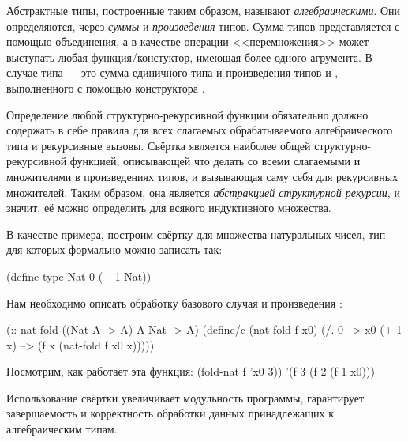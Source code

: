 \noindent
Абстрактные типы, построенные таким образом, называют \emph{алгебраическими}. Они определяются, через \emph{суммы} и \emph{произведения} типов. Сумма типов представляется с помощью объединения, а в качестве операции <<перемножения>> может выступать любая функция\=/констуктор, имеющая более одного агрумента. В случае типа  --- это сумма единичного типа  и произведения типов  и , выполненного с помощью конструктора .

Определение любой структурно-рекурсивной функции обязательно должно содержать в себе правила для всех слагаемых обрабатываемого алгебраического типа и рекурсивные вызовы. Свёртка является наиболее общей структурно-рекурсивной функцией, описывающей что делать со всеми слагаемыми и множителями в произведениях типов, и вызывающая саму себя для рекурсивных множителей.
Таким образом, она является \emph{абстракцией структурной рекурсии}, и значит, её можно определить для всякого индуктивного множества. 

В качестве примера, построим свёртку для множества натуральных чисел, тип для которых формально можно записать так:
\vspace{-\bigskipamount}
\begin{SchemeCode}
(define-type Nat
  0
  (+ 1 Nat))
\end{SchemeCode}

\noindent
Нам необходимо описать обработку базового случая  и произведения :
\begin{Definition}
(:: nat-fold ((Nat A -> A) A Nat -> A)
  (define/c (nat-fold f x0)
    (/. 0 --> x0
        (+ 1 x) --> (f x (nat-fold f x0 x)))))
\end{Definition}
Посмотрим, как работает эта функция:
\REPL
  {(fold-nat f 'x0 3))}
  {'(f 3 (f 2 (f 1 x0)))}

Использование свёртки увеличивает модульность программы, гарантирует завершаемость и корректность обработки данных принадлежащих к алгебраическим типам.

